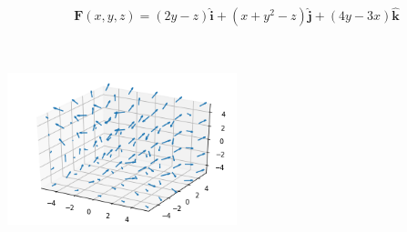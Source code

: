 \begin{align*}
    \boldsymbol{F}(x, y, z) = (2y - z) \boldsymbol{\hat{i}} + (x + y^2 - z) \boldsymbol{\hat{j}} + (4y - 3x) \boldsymbol{\hat{k}}
\end{align*}

\begin{solution}\
\begin{center}
    \includegraphics[width=0.5\textwidth]{img/e3p4.png}
\end{center}
\end{solution}